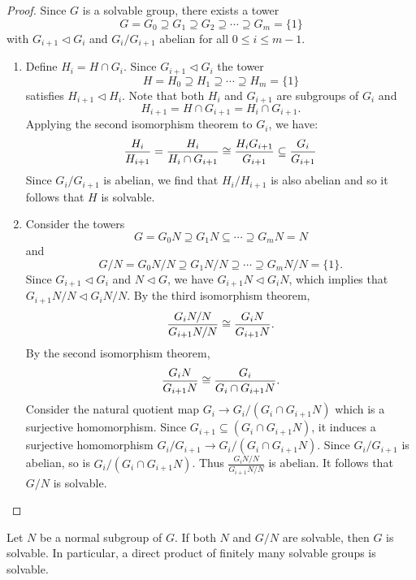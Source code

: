 \documentclass[11pt]{article}
\begin{document}
\begin{proof}
    Since $G$ is a solvable group, there exists a tower
    \[G=G_0\supseteq G_1\supseteq G_2\supseteq\cdots\supseteq G_m=\{1\}\]
    with $G_{i+1}\lhd G_i$ and $G_i/G_{i+1}$ abelian for all $0\leq i\leq m-1$.
    \begin{enumerate}
        \item Define $H_i=H\cap G_i$. Since $G_{i+1}\lhd G_i$ the tower
        \[H=H_0\supseteq H_1\supseteq\cdots\supseteq H_m=\{1\}\]
        satisfies $H_{i+1}\lhd H_i$. Note that both $H_i$ and $G_{i+1}$ are subgroups of $G_i$ and
        \[H_{i+1}=H\cap G_{i+1}=H_i\cap G_{i+1}.\]
        Applying the second isomorphism theorem to $G_i$, we have:
        \[\frac{H_i}{H_{i+1}}=\frac{H_i}{H_i\cap G_{i+1}}\cong\frac{H_iG_{i+1}}{G_{i+1}}\subseteq\frac{G_i}{G_{i+1}}\]
        Since $G_i/G_{i+1}$ is abelian, we find that $H_i/H_{i+1}$ is also abelian and so it follows that $H$ is solvable.

        \item Consider the towers
        \[G=G_0N\supseteq G_1N\subseteq\cdots\supseteq G_mN=N\]
        and
        \[G/N=G_0N/N\supseteq G_1N/N\supseteq\cdots\supseteq G_mN/N=\{1\}.\]
        Since $G_{i+1}\lhd G_i$ and $N\lhd G$, we have $G_{i+1}N\lhd G_iN$, which implies that $G_{i+1}N/N\lhd G_iN/N$. By the third isomorphism theorem,
        \[\frac{G_iN/N}{G_{i+1}N/N}\cong\frac{G_iN}{G_{i+1}N}.\]
        By the second isomorphism theorem,
        \[\frac{G_iN}{G_{i+1}N}\cong\frac{G_i}{G_i\cap G_{i+1}N}.\]
        Consider the natural quotient map $G_i\to G_i/(G_i\cap G_{i+1}N)$ which is a surjective homomorphism. Since $G_{i+1}\subseteq(G_i\cap G_{i+1}N)$, it induces a surjective homomorphism $G_i/G_{i+1}\to G_i/(G_i\cap G_{i+1}N)$. Since $G_i/G_{i+1}$ is abelian, so is $G_i/(G_i\cap G_{i+1}N)$. Thus $\frac{G_iN/N}{G_{i+1}N/N}$ is abelian. It follows that $G/N$ is solvable.
    \end{enumerate}
\end{proof}

\begin{theorem}
    Let $N$ be a normal subgroup of $G$. If both $N$ and $G/N$ are solvable, then $G$ is solvable. In particular, a direct product of finitely many solvable groups is solvable.
\end{theorem}
\end{document}
